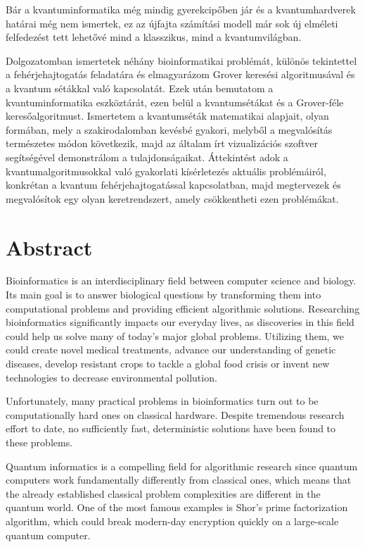 Bár a kvantuminformatika még mindig gyerekcipőben jár és a kvantumhardverek határai még nem ismertek, ez az újfajta számítási modell már sok új elméleti felfedezést tett lehetővé mind a klasszikus, mind a kvantumvilágban.

Dolgozatomban ismertetek néhány bioinformatikai problémát, különös tekintettel a fehérjehajtogatás feladatára és elmagyarázom Grover keresési algoritmusával és a kvantum sétákkal való kapcsolatát. Ezek után bemutatom a kvantuminformatika eszköztárát, ezen belül a kvantumsétákat és a Grover-féle keresőalgoritmust. Ismertetem a kvantumséták matematikai alapjait, olyan formában, mely a szakirodalomban kevésbé gyakori, melyből a megvalósítás természetes módon következik, majd az általam írt vizualizációs szoftver segítségével demonstrálom a tulajdonságaikat. Áttekintést adok a kvantumalgoritmusokkal való gyakorlati kísérletezés aktuális problémáiról, konkrétan a kvantum fehérjehajtogatással kapcsolatban, majd megtervezek és megvalósítok egy olyan keretrendszert, amely csökkentheti ezen problémákat.

\vfill

\selectenglish

\chapter*{Abstract}

Bioinformatics is an interdisciplinary field between computer science and biology. Its main goal is to answer biological questions by transforming them into computational problems and providing efficient algorithmic solutions. Researching bioinformatics significantly impacts our everyday lives, as discoveries in this field could help us solve many of today's major global problems. Utilizing them, we could create novel medical treatments, advance our understanding of genetic diseases, develop resistant crops to tackle a global food crisis or invent new technologies to decrease environmental pollution.

Unfortunately, many practical problems in bioinformatics turn out to be computationally hard ones on classical hardware. Despite tremendous research effort to date, no sufficiently fast, deterministic solutions have been found to these problems.

Quantum informatics is a compelling field for algorithmic research since quantum computers work fundamentally differently from classical ones, which means that the already established classical problem complexities are different in the quantum world. One of the most famous examples is Shor's prime factorization algorithm, which could break modern-day encryption quickly on a large-scale quantum computer.

